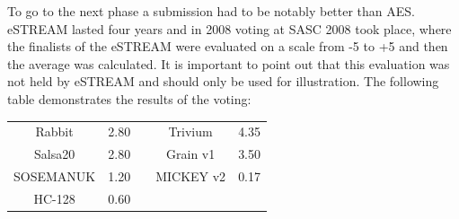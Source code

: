 To go to the next phase a submission had to be notably better than AES.
eSTREAM lasted four years and in 2008 voting at SASC 2008 took place, where the finalists of the eSTREAM were evaluated on a scale from -5 to +5 and then the average was calculated. It is important to point out that this evaluation was not held by eSTREAM and should only be used for illustration. The following table demonstrates the results of the voting:
\begin{table}[h!]
	\centering
	\begin{tabular}{|c c |c| c c|} 
		\hline 
		Rabbit & 2.80 & & Trivium & 4.35\\ 
		Salsa20 & 2.80 & & Grain v1 & 3.50\\
		SOSEMANUK & 1.20 & & MICKEY v2& 0.17\\
		HC-128 & 0.60 & & & \\[1ex]
		\hline
	\end{tabular}
	\label{table:eStream portfolio with SASC2008 evaluation}
\end{table}


